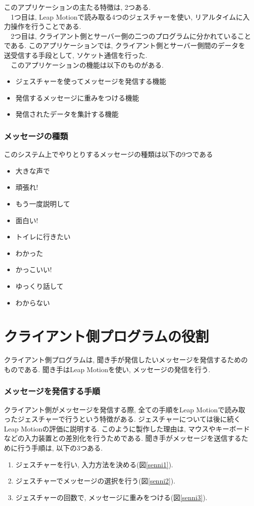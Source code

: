 \documentclass{funthesis}
\begin{document}
このアプリケーションの主たる特徴は, 2つある.\\
　1つ目は, Leap Motionで読み取る4つのジェスチャーを使い, リアルタイムに入力操作を行うことである. \\
　2つ目は, クライアント側とサーバー側の二つのプログラムに分かれていることである. このアプリケーションでは, クライアント側とサーバー側間のデータを送受信する手段として, ソケット通信を行った. \\
　このアプリケーションの機能は以下のものがある.
\begin{itemize}
 \item ジェスチャーを使ってメッセージを発信する機能
 \item 発信するメッセージに重みをつける機能
 \item 発信されたデータを集計する機能
\end{itemize}

\subsubsection{メッセージの種類}
このシステム上でやりとりするメッセージの種類は以下の9つである
\begin{itemize}
 \item 大きな声で
 \item 頑張れ!
 \item もう一度説明して
 \item 面白い!
 \item トイレに行きたい
 \item わかった
 \item かっこいい!
  \item ゆっくり話して
 \item わからない
\end{itemize}


\section{クライアント側プログラムの役割}
クライアント側プログラムは, 聞き手が発信したいメッセージを発信するためのものである.  聞き手はLeap Motionを使い, メッセージの発信を行う. 

\subsubsection{メッセージを発信する手順}

クライアント側がメッセージを発信する際, 全ての手順をLeap Motionで読み取ったジェスチャーで行うという特徴がある. ジェスチャーについては後に続くLeap Motionの評価に説明する. このように製作した理由は, マウスやキーボードなどの入力装置との差別化を行うためである. 聞き手がメッセージを送信するために行う手順は, 以下の3つある. 
\begin{enumerate}
 \item ジェスチャーを行い, 入力方法を決める(図\ref{senni1}). 
 \item ジェスチャーでメッセージの選択を行う(図\ref{senni2}). 
 \item ジェスチャーの回数で, メッセージに重みをつける(図\ref{senni3}). 
\end{enumerate}
\end{document}
